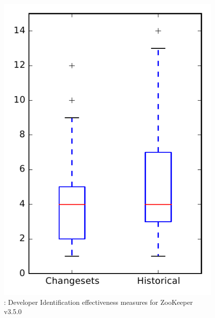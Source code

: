 
\begin{figure}
\centering
\includegraphics[height=0.4\textheight]{figures/dit/rq2_zookeeper}
\caption{\dtwo: Developer Identification effectiveness measures for ZooKeeper v3.5.0}
\label{fig:dit:rq2:zookeeper}
\end{figure}
